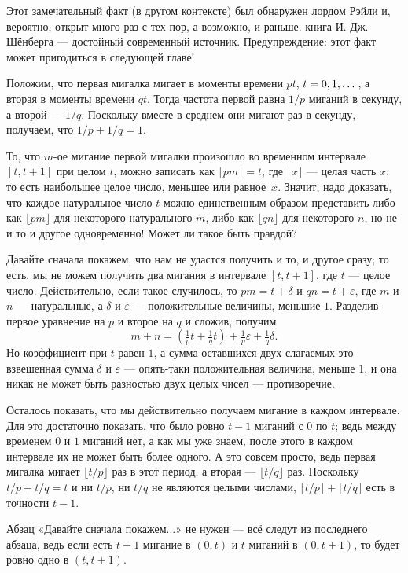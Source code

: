 Этот замечательный факт (в другом контексте) был обнаружен лордом Рэйли и, вероятно, открыт много раз с тех пор, а возможно, и раньше.
книга И. Дж. Шёнберга \cite{schoenberg} --- достойный современный источник.
Предупреждение: этот факт может пригодиться в следующей главе!

Положим, что первая мигалка мигает в моменты времени $pt$, $t \z= 0, 1, \dots$, а вторая в моменты времени $qt$.
Тогда частота первой равна $1/p$ миганий в секунду, а второй --- $1/q$.
Поскольку вместе в среднем они мигают раз в секунду, получаем, что $1/p + 1/q = 1$.

То, что $m$-ое мигание первой мигалки произошло во временном интервале $[t, t + 1]$ при целом $t$,
можно записать как $\lfloor pm\rfloor = t$, где $\lfloor x\rfloor$ — целая часть $x$; то есть наибольшее целое число, меньшее или равное~$x$.
Значит, надо доказать, что каждое натуральное число $t$ можно единственным образом представить либо как $\lfloor pm\rfloor$ для некоторого натурального $m$, либо как $\lfloor qn\rfloor$ для некоторого $n$, но не и то и другое одновременно!
Может ли такое быть правдой?

Давайте сначала покажем, что нам не удастся получить и то, и другое сразу;
то есть, мы не можем получить два мигания в интервале $[t, t+1]$, где $t$ --- целое число.
Действительно, если такое случилось, то $pm = t+\delta$ и $qn = t + \varepsilon$, где $m$ и $n$ --- натуральные, а $\delta$ и $\varepsilon$ --- положительные величины, меньшие $1$. 
Разделив первое уравнение на $p$ и второе на $q$ и сложив, получим
\[m+n=(\tfrac1pt+\tfrac1qt)+\tfrac1p\varepsilon+\tfrac1q\delta.\]
Но коэффициент при $t$ равен $1$, а сумма оставшихся двух слагаемых это взвешенная сумма $\delta$ и $\varepsilon$ --- опять-таки положительная величина, меньше $1$, и она никак не может быть разностью двух целых чисел --- противоречие.

Осталось показать, что мы действительно получаем мигание в каждом интервале.
Для это достаточно показать, что было ровно $t - 1$ миганий с $0$ по $t$;
ведь между временем $0$ и $1$ миганий нет, а как мы уже знаем, после этого в каждом интервале их не может быть более одного.
А это совсем просто, ведь первая мигалка мигает $\lfloor t/p\rfloor$ раз в этот период, а вторая --- $\lfloor t/q\rfloor$ раз.
Поскольку $t/p + t/q = t$ и ни $t/p$, ни $t/q$ не являются целыми числами, $\lfloor t/p\rfloor + \lfloor t/q\rfloor$ есть в точности $t - 1$.

\begin{addedbytheeditors}
Абзац «Давайте сначала покажем...» не нужен --- всё следут из последнего абзаца, ведь если есть $t-1$ мигание в $(0,t)$ и $t$ миганий в $(0,t+1)$, то будет ровно одно в $(t,t+1)$.
\end{addedbytheeditors}


